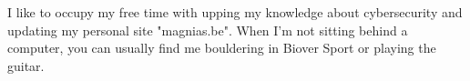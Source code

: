 


I like to occupy my free time with upping my knowledge about cybersecurity and updating my personal site "magnias.be". When I'm not sitting behind a computer, you can usually find me bouldering in Biover Sport or playing the guitar.



